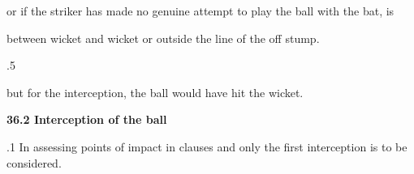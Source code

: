 \documentclass[12pt]{article}
\begin{document}
\vspace{\baselineskip}

\vspace{\baselineskip}

\vspace{\baselineskip}
\begin{Center}
{\fontsize{8pt}{9.6pt}\par}
\end{Center}\par


\vspace{\baselineskip}
\begin{adjustwidth}{0.5in}{0.0in}
{\fontsize{9pt}{10.8pt}\selectfont or if the striker has made no genuine attempt to play the ball with the bat, is\par}\par

\end{adjustwidth}


\vspace{\baselineskip}
\begin{adjustwidth}{0.5in}{0.0in}
{\fontsize{9pt}{10.8pt}\selectfont between wicket and wicket or outside the line of the off stump.\par}\par

\end{adjustwidth}


\vspace{\baselineskip}
{\fontsize{9pt}{10.8pt}.5 \tabto{0.49in} {\fontsize{8pt}{9.6pt}\selectfont but for the interception, the ball would have hit the wicket.\par}\par}\par


\vspace{\baselineskip}
{\fontsize{11pt}{13.2pt}\selectfont \textbf{36.2 \tabto{0.47in} Interception of the ball}\par}\par


\vspace{\baselineskip}
\begin{adjustwidth}{0.5in}{0.51in}
{\fontsize{9pt}{10.8pt}.1 \tabto{0.49in} In assessing points of impact in clauses and only the first interception is to be considered.\par}\par

\end{adjustwidth}
\end{document}
